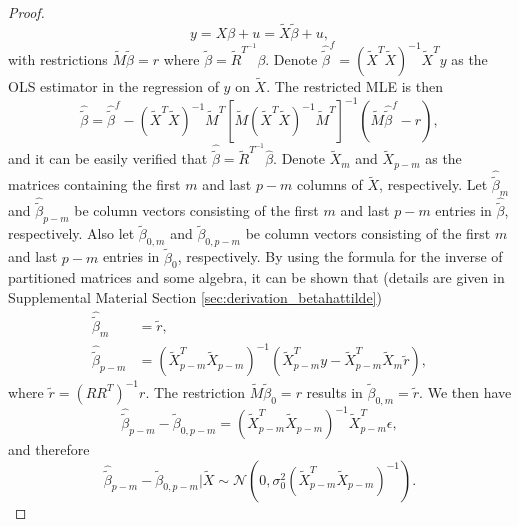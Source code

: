 \begin{proof}
\begin{equation*}
y = X \beta + u = \tilde{X} \tilde{\beta} + u,
\end{equation*}
with restrictions $\tilde{M} \tilde{\beta} = r$ where $\tilde{\beta} = \tilde{R}^{T^{-1}} \beta$. Denote $\hat{\tilde{\beta}}^f = (\tilde{X}^T \tilde{X})^{-1}\tilde{X}^Ty$ as the OLS estimator in the regression of $y$ on $\tilde{X}$. The restricted MLE is then
\begin{equation*}
\hat{\tilde{\beta}} = \hat{\tilde{\beta}}^f - \left( \tilde{X}^T \tilde{X} \right)^{-1} \tilde{M}^T \left[ \tilde{M} (\tilde{X}^T \tilde{X})^{-1} \tilde{M}^T \right]^{-1} \left( \tilde{M} \hat{\tilde{\beta}}^f - r \right),
\end{equation*}
and it can be easily verified that $\hat{\tilde{\beta}} = \tilde{R}^{T^{-1}} \hat{\beta}$. Denote $\tilde{X}_m$ and $\tilde{X}_{p-m}$ as the matrices containing the first $m$ and last $p-m$ columns of $\tilde{X}$, respectively. Let $\hat{\tilde{\beta}}_{m}$ and $\hat{\tilde{\beta}}_{p-m}$ be column vectors consisting of the first $m$ and last $p-m$ entries in $\hat{\tilde{\beta}}$, respectively. Also let $\tilde{\beta}_{0,m}$ and $\tilde{\beta}_{0,p-m}$ be column vectors consisting of the first $m$ and last $p-m$ entries in $\tilde{\beta}_0$, respectively. By using the formula for the inverse of partitioned matrices and some algebra, it can be shown that (details are given in Supplemental Material Section \ref{sec:derivation_betahattilde})
\begin{equation}
\begin{aligned}
\hat{\tilde{\beta}}_m &= \tilde{r},\\
\hat{\tilde{\beta}}_{p-m} &= \left( \tilde{X}_{p-m}^T \tilde{X}_{p-m} \right)^{-1} \left( \tilde{X}_{p-m}^Ty - \tilde{X}_{p-m}^T\tilde{X}_{m}\tilde{r} \right),
\end{aligned}
\label{eq:betahat_tilde_partition}
\end{equation}
where $\tilde{r} = (R R^T)^{-1}r$. The restriction $\tilde{M}\tilde{\beta}_0=r$ results in $\tilde{\beta}_{0,m} = \tilde{r}$. We then have 
\begin{equation*}
\hat{\tilde{\beta}}_{p-m} - \tilde{\beta}_{0,p-m} = \left( \tilde{X}_{p-m}^T \tilde{X}_{p-m} \right)^{-1} \tilde{X}_{p-m} ^T \epsilon,
\end{equation*}
and therefore 
\begin{equation*}
\hat{\tilde{\beta}}_{p-m} - \tilde{\beta}_{0,p-m} \big | \tilde{X} \sim \mathcal{N} \left(0, \sigma_0^2 \left( \tilde{X}_{p-m}^T \tilde{X}_{p-m} \right)^{-1} \right).

\end{equation*}
\end{proof}
